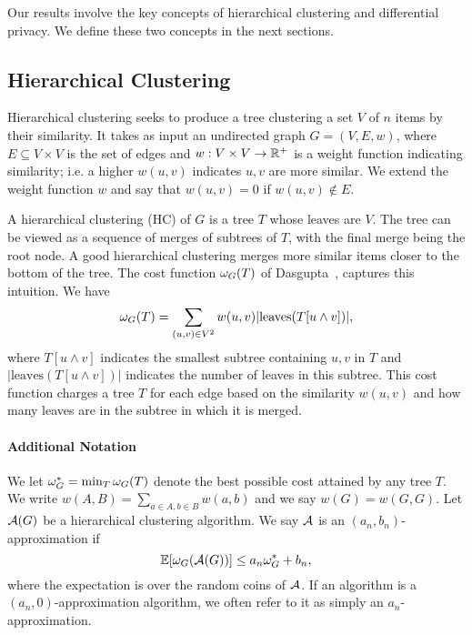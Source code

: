 Our results involve the key concepts of hierarchical clustering and differential privacy. We define these two concepts in the next sections.

\subsection{Hierarchical Clustering}

Hierarchical clustering seeks to produce a tree clustering a set $V$ of $n$ items by their similarity. It takes as input an undirected graph $G = (V, E, w)$, where $E \subseteq V \times V$ is the set of edges and $w : V \times V \rightarrow \mathbb{R}^+$ is a weight function indicating similarity; i.e. a higher $w(u,v)$ indicates $u,v$ are more similar. We extend the weight function $w$ and say that $w(u,v) = 0$ if $w(u,v) \notin E$.

A hierarchical clustering (HC) of $G$ is a tree $T$ whose leaves are $V$. The tree can be viewed as a sequence of merges of subtrees of $T$, with the final merge being the root node. A good hierarchical clustering merges more similar items closer to the bottom of the tree. The cost function $\omega_G(T)$ of Dasgupta~\citep{dasgupta2016cost}, captures this intuition. We have
\begin{equation}\label{chap5-eq:hc-cost}
    \omega_G(T) = \sum_{(u,v) \in V^2} w(u,v) |\text{leaves}(T[u\wedge v])|,
\end{equation}
where $T[u \wedge v]$ indicates the smallest subtree containing $u,v$ in $T$ and $|\text{leaves}(T[u \wedge v])|$ indicates the number of leaves in this subtree. This cost function charges a tree $T$ for each edge based on the similarity $w(u,v)$ and how many leaves are in the subtree in which it is merged. 

\paragraph{Additional Notation}
We let $\omega_G^* = \min_T \omega_G(T)$ denote the best possible cost attained by any tree $T$. We write $w(A,B) = \sum_{a \in A, b \in B} w(a,b)$ and we say $w(G) = w(G,G)$. Let $\mathcal{A}(G)$ be a hierarchical clustering algorithm. We say $\mathcal{A}$ is an $(a_n, b_n)$-approximation if
\begin{equation}\label{chap5-eq:hc-obj}
    \operatorname{\mathbb{E}}[\omega_G(\mathcal{A}(G))] \leq a_n \omega_G^* + b_n,
\end{equation}
where the expectation is over the random coins of $\mathcal{A}$. If an algorithm is a $(a_n, 0)$-approximation algorithm, we often refer to it as simply an $a_n$-approximation.

